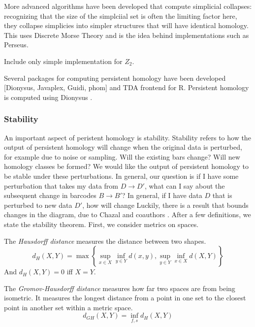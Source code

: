 More advanced algorithms have been developed that compute simplicial collapses: recognizing that the size of the simplciial set is often the limiting factor here, they collapse simplicies into simpler structures that will have identical homology.
This uses Discrete Morse Theory and is the idea behind implementations such as Perseus.

Include only simple implementation for $Z_2$.

Several packages for computing persistent homology have been developed [Dionysus, Javaplex, Guidi, phom] and TDA frontend for R.
Persistent homology is computed using Dionysus \cite{Morozov:2012}.

\subsubsection{Stability}
\label{subsubsec:ph_stability}

An important aspect of peristent homology is stability.
Stability refers to how the output of persistent homology will change when the original data is perturbed, for example due to noise or sampling.
Will the existing bars change?
Will new homology classes be formed?
We would like the output of persistent homology to be stable under these perturbations.
In general, our question is if I have some perturbation that takes my data from $D\rightarrow D'$, what can I say about the subsequent change in barcodes $B\rightarrow B'$?
In general, if I have data $D$ that is perturbed to new data $D'$, how will change
Luckily, there is a result that bounds changes in the diagram, due to Chazal and coauthors \citep{Chazal:2009wc}.
After a few definitions, we state the stability theorem.
First, we consider metrics on spaces.

\begin{defn}
\label{defn:hausdorff}
The \emph{Hausdorff distance} measures the distance between two shapes.
\begin{equation}
d_{H}(X,Y) = \max\left\{ \sup_{x \in X} \inf_{y \in Y} d(x,y), \sup_{y \in Y} \inf_{x \in X} d(X,Y) \right\}
\end{equation}
And $d_H(X,Y)=0$ iff $X=Y$.
\end{defn}

\begin{defn}
\label{defn:gromovhausdorff}
The \emph{Gromov-Hausdorff distance} measures how far two spaces are from being isometric.
It measures the longest distance from a point in one set to the closest point in another set within a metric space.
\begin{equation}
d_{GH}(X,Y)=\inf_{f,s} d_H(X,Y)
\end{equation}
\end{defn}

